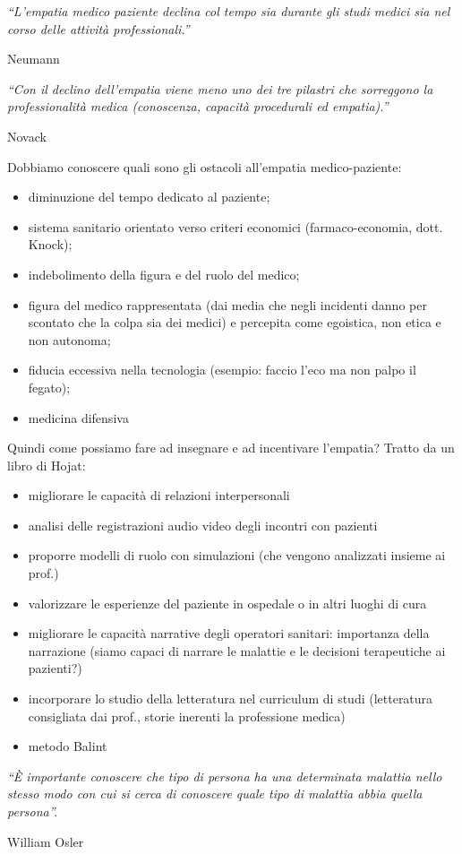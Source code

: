 \documentclass[]{article}
\begin{document}
\emph{``L'empatia medico paziente declina col tempo sia durante gli
studi medici sia nel corso delle attività professionali.''}

Neumann

\emph{``Con il declino dell'empatia viene meno uno dei tre pilastri che
sorreggono la professionalità medica (conoscenza, capacità procedurali
ed empatia).''}

Novack

Dobbiamo conoscere quali sono gli ostacoli all'empatia medico-paziente:

\begin{itemize}
\item
  diminuzione del tempo dedicato al paziente;
\end{itemize}

\begin{itemize}
\item
  sistema sanitario orientato verso criteri economici (farmaco-economia,
  dott. Knock);
\item
  indebolimento della figura e del ruolo del medico;
\item
  figura del medico rappresentata (dai media che negli incidenti danno
  per scontato che la colpa sia dei medici) e percepita come egoistica,
  non etica e non autonoma;
\item
  fiducia eccessiva nella tecnologia (esempio: faccio l'eco ma non palpo
  il fegato);
\item
  medicina difensiva
\end{itemize}

Quindi come possiamo fare ad insegnare e ad incentivare l'empatia?
Tratto da un libro di Hojat:

\begin{itemize}
\item
  migliorare le capacità di relazioni interpersonali
\item
  analisi delle registrazioni audio video degli incontri con pazienti
\item
  proporre modelli di ruolo con simulazioni (che vengono analizzati
  insieme ai prof.)
\item
  valorizzare le esperienze del paziente in ospedale o in altri luoghi
  di cura
\item
  migliorare le capacità narrative degli operatori sanitari: importanza
  della narrazione (siamo capaci di narrare le malattie e le decisioni
  terapeutiche ai pazienti?)
\item
  incorporare lo studio della letteratura nel curriculum di studi
  (letteratura consigliata dai prof., storie inerenti la professione
  medica)
\item
  metodo Balint
\end{itemize}

\emph{``È importante conoscere che tipo di persona ha una determinata
malattia nello stesso modo con cui si cerca di conoscere quale tipo di
malattia abbia quella persona''.}

William Osler
\end{document}
